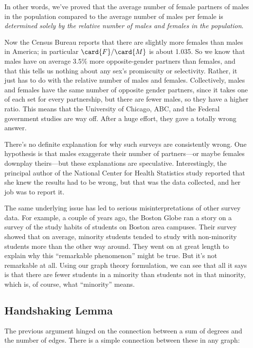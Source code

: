 In other words, we've proved that the average number of female
partners of males in the population compared to the average number of
males per female is \emph{determined solely by the relative number of
  males and females in the population}.

Now the Census Bureau reports that there are slightly more females
than males in America; in particular $\card{F} / \card{M}$ is about
1.035.  So we know that males have on average 3.5\% more
opposite-gender partners than females, and that this tells us nothing about
any sex's promiscuity or selectivity.  Rather, it just has to do with
the relative number of males and females.  Collectively, males and
females have the same number of opposite gender partners, since it
takes one of each set for every partnership, but there are fewer
males, so they have a higher ratio.  This means that the University of
Chicago, ABC, and the Federal government studies are way off.  After a
huge effort, they gave a totally wrong answer.

There's no definite explanation for why such surveys are consistently
wrong.  One hypothesis is that males exaggerate their number of
partners---or maybe females downplay theirs---but these explanations
are speculative.  Interestingly, the principal author of the National
Center for Health Statistics study reported that she knew the results
had to be wrong, but that was the data collected, and her job was to
report it.

The same underlying issue has led to serious misinterpretations of
other survey data.  For example, a couple of years ago, the Boston
Globe ran a story on a survey of the study habits of students on
Boston area campuses.  Their survey showed that on average, minority
students tended to study with non-minority students more than the
other way around.  They went on at great length to explain why this
``remarkable phenomenon'' might be true.  But it's not remarkable at
all.  Using our graph theory formulation, we can see that all it says
is that there are fewer students in a minority than students not in
that minority, which is, of course, what ``minority'' means.

\subsection{Handshaking Lemma} 
The previous argument hinged on the connection between a sum of
degrees and the number of edges.  There is a simple connection between
these in any graph:

